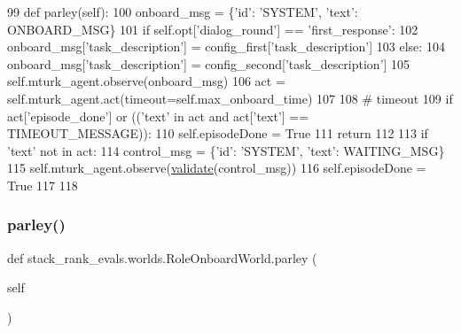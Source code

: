 \begin{DoxyCode}
99     \textcolor{keyword}{def }parley(self):
100         onboard\_msg = \{\textcolor{stringliteral}{'id'}: \textcolor{stringliteral}{'SYSTEM'}, \textcolor{stringliteral}{'text'}: ONBOARD\_MSG\}
101         \textcolor{keywordflow}{if} self.opt[\textcolor{stringliteral}{'dialog\_round'}] == \textcolor{stringliteral}{'first\_response'}:
102             onboard\_msg[\textcolor{stringliteral}{'task\_description'}] = config\_first[\textcolor{stringliteral}{'task\_description'}]
103         \textcolor{keywordflow}{else}:
104             onboard\_msg[\textcolor{stringliteral}{'task\_description'}] = config\_second[\textcolor{stringliteral}{'task\_description'}]
105         self.mturk\_agent.observe(onboard\_msg)
106         act = self.mturk\_agent.act(timeout=self.max\_onboard\_time)
107 
108         \textcolor{comment}{# timeout}
109         \textcolor{keywordflow}{if} act[\textcolor{stringliteral}{'episode\_done'}] \textcolor{keywordflow}{or} ((\textcolor{stringliteral}{'text'} \textcolor{keywordflow}{in} act \textcolor{keywordflow}{and} act[\textcolor{stringliteral}{'text'}] == TIMEOUT\_MESSAGE)):
110             self.episodeDone = \textcolor{keyword}{True}
111             \textcolor{keywordflow}{return}
112 
113         \textcolor{keywordflow}{if} \textcolor{stringliteral}{'text'} \textcolor{keywordflow}{not} \textcolor{keywordflow}{in} act:
114             control\_msg = \{\textcolor{stringliteral}{'id'}: \textcolor{stringliteral}{'SYSTEM'}, \textcolor{stringliteral}{'text'}: WAITING\_MSG\}
115             self.mturk\_agent.observe(\hyperlink{namespaceparlai_1_1core_1_1worlds_afc3fad603b7bce41dbdc9cdc04a9c794}{validate}(control\_msg))
116             self.episodeDone = \textcolor{keyword}{True}
117 
118 
\end{DoxyCode}
\mbox{\label{classstack__rank__evals_1_1worlds_1_1RoleOnboardWorld_ad01c1064fd3c5f1ac4746d043f47bfbc}} 
\subsubsection{\texorpdfstring{parley()}{parley()}\hspace{0.1cm}{\footnotesize\ttfamily [2/2]}}
{\footnotesize\ttfamily def stack\+\_\+rank\+\_\+evals.\+worlds.\+Role\+Onboard\+World.\+parley (\begin{DoxyParamCaption}\item[{}]{self }\end{DoxyParamCaption})}



